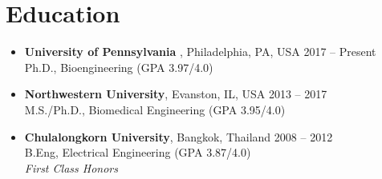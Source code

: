\section{\sc Education}

\begin{itemize}[leftmargin=0cm, label={}]

\item {\bf University of Pennsylvania }, Philadelphia, PA, USA \hfill 2017 -- Present \\
Ph.D., Bioengineering \hfill (GPA 3.97/4.0)

\item {\bf Northwestern University}, Evanston, IL, USA \hfill 2013 -- 2017 \\
M.S./Ph.D., Biomedical Engineering \hfill (GPA 3.95/4.0)

\item {\bf Chulalongkorn University}, Bangkok, Thailand \hfill 2008 -- 2012 \\
B.Eng, Electrical Engineering \hfill (GPA 3.87/4.0)\\
{\em First Class Honors}

\end{itemize}
